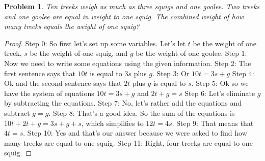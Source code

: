 \documentclass{article}
\newtheorem{theorem}{Problem}
\begin{document}
\begin{theorem}
Ten treeks weigh as much as three squigs and one goolee. Two treeks and one goolee are equal in weight to one squig. The combined weight of how many treeks equals the weight of one squig?
\end{theorem}

\begin{proof}
Step 0: So first let's set up some variables. Let's let $t$ be the weight of one treek, $s$ be the weight of one squig, and $g$ be the weight of one goolee.
Step 1: Now we need to write some equations using the given information.
Step 2: The first sentence says that $10t$ is equal to $3s$ plus $g$.
Step 3: Or $10t=3s+g$
Step 4: Ok and the second sentence says that $2t$ plus $g$ is equal to $s$.
Step 5: Ok so we have the system of equations $10t=3s+g$ and $2t+g=s$
Step 6: Let's eliminate $g$ by subtracting the equations.
Step 7: No, let's rather add the equations and subtract $g=g$.
Step 8: That's a good idea. So the sum of the equations is $10t+2t+g=3s+g+s$, which simplifies to $12t=4s$.
Step 9: That means that $4t=s$.
Step 10: Yes and that's our answer because we were asked to find how many treeks are equal to one squig.
Step 11: Right, four treeks are equal to one squig.
\end{proof}
\end{document}
